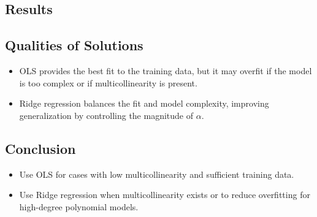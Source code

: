 \subsection*{Results}


\subsection*{Qualities of Solutions}
\begin{itemize}
    \item OLS provides the best fit to the training data, but it may overfit if the model is too complex or if multicollinearity is present.
    \item Ridge regression balances the fit and model complexity, improving generalization by controlling the magnitude of $\alpha$.
\end{itemize}

\subsection*{Conclusion}
\begin{itemize}
    \item Use OLS for cases with low multicollinearity and sufficient training data.
    \item Use Ridge regression when multicollinearity exists or to reduce overfitting for high-degree polynomial models.
\end{itemize}

